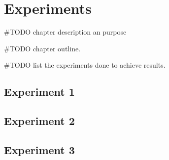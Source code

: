\chapter{Experiments}\label{experiments}
#TODO chapter description an purpose

#TODO chapter outline. 

#TODO list the experiments done to achieve results. 
\section{Experiment 1}

\section{Experiment 2}

\section{Experiment 3}

